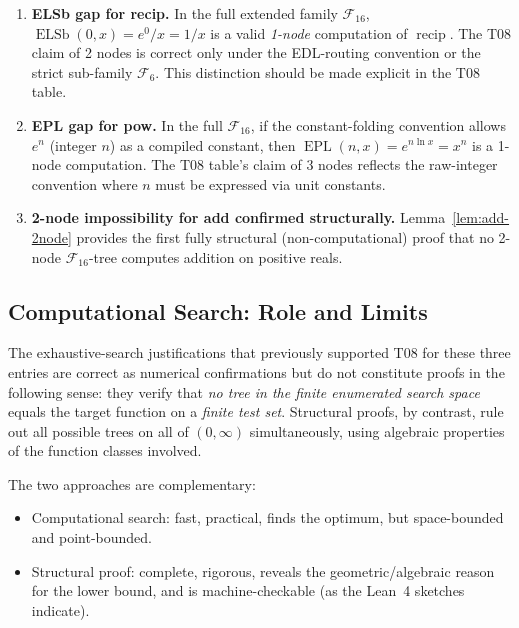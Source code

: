 \documentclass[12pt,a4paper]{article}
\theoremstyle{definition}
\newcommand{\EPL}{\operatorname{EPL}}
\newcommand{\ELSb}{\operatorname{ELSb}}
\newcommand{\F}{\mathcal{F}_{16}}
\newcommand{\recip}{\operatorname{recip}}
\begin{document}
\begin{enumerate}
  \item \textbf{ELSb gap for recip.}
        In the full extended family $\F$, $\ELSb(0,x)=e^0/x=1/x$ is a valid
        \emph{1-node} computation of $\recip$.
        The T08 claim of 2 nodes is correct only under the EDL-routing convention
        or the strict sub-family $\mathcal{F}_6$.
        This distinction should be made explicit in the T08 table.

  \item \textbf{EPL gap for pow.}
        In the full $\F$, if the constant-folding convention allows $e^n$
        (integer $n$) as a compiled constant, then $\EPL(n, x) = e^{n\ln x} = x^n$
        is a 1-node computation.  The T08 table's claim of 3 nodes reflects the
        raw-integer convention where $n$ must be expressed via unit constants.

  \item \textbf{2-node impossibility for add confirmed structurally.}
        Lemma~\ref{lem:add-2node} provides the first fully structural (non-computational)
        proof that no 2-node $\F$-tree computes addition on positive reals.
\end{enumerate}

\subsection{Computational Search: Role and Limits}

The exhaustive-search justifications that previously supported T08 for these
three entries are correct as numerical confirmations but do not constitute proofs
in the following sense: they verify that \emph{no tree in the finite enumerated
search space} equals the target function on a \emph{finite test set}.
Structural proofs, by contrast, rule out all possible trees on all of $(0,\infty)$
simultaneously, using algebraic properties of the function classes involved.

The two approaches are complementary:
\begin{itemize}
  \item Computational search: fast, practical, finds the optimum, but space-bounded
        and point-bounded.
  \item Structural proof: complete, rigorous, reveals the geometric/algebraic reason
        for the lower bound, and is machine-checkable (as the Lean~4 sketches indicate).
\end{itemize}
\end{document}
